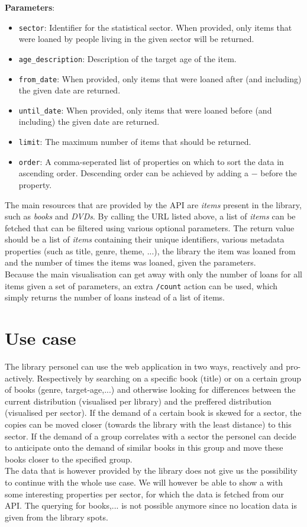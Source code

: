 {\bf Parameters}:
\begin{itemize}
  \item \texttt{sector}: Identifier for the statistical sector. When provided, only items that were loaned by people living in the given sector will be returned.
  \item \texttt{age\_description}: Description of the target age of the item.
  \item \texttt{from\_date}: When provided, only items that were loaned after (and including) the given date are returned.
  \item \texttt{until\_date}: When provided, only items that were loaned before (and including) the given date are returned.
  \item \texttt{limit}: The maximum number of items that should be returned.
  \item \texttt{order}: A comma-seperated list of properties on which to sort the data in ascending order. Descending order can be achieved by adding a $-$ before the property.
\end{itemize}

The main resources that are provided by the API are \emph{items} present in the library, such as \emph{books} and \emph{DVDs}.
By calling the URL listed above, a list of \emph{items} can be fetched that can be filtered using various optional parameters.
The return value should be a list of \emph{items} containing their unique identifiers, various metadata properties (such as title, genre, theme, ...), the library the item was loaned from and the number of times the items was loaned, given the parameters.\\

Because the main visualisation can get away with only the number of loans for all items given a set of parameters, an extra \texttt{/count} action can be used, which simply returns the number of loans instead of a list of items.

\section{Use case}

The library personel can use the web application in two ways, reactively and pro-actively. Respectively by searching on a specific book (title) or on a certain group of books (genre, target-age,...) and otherwise looking for differences between the current distribution (visualised per library) and the preffered distribution (visualised per sector). If the demand of a certain book is skewed for a sector, the copies can be moved closer (towards the library with the least distance) to this sector. If the demand of a group correlates with a sector the personel can decide to anticipate onto the demand of similar books in this group and move these books closer to the specified group.\\

The data that is however provided by the library does not give us the possibility to continue with the whole use case. We will however be able to show a with some interesting properties per sector, for which the data is fetched from our API. The querying for books,... is not possible anymore since no location data is given from the library spots.
